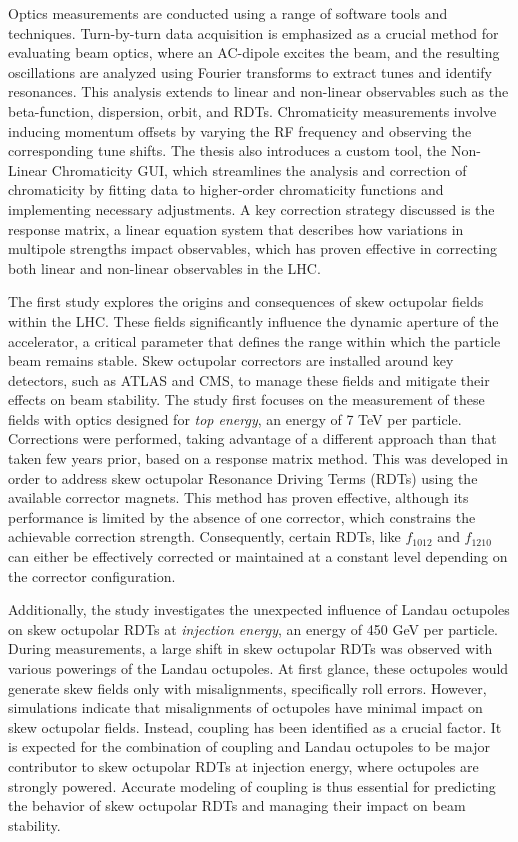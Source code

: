 {Optics measurements are conducted using a range of software tools and techniques. Turn-by-turn data
acquisition is emphasized as a crucial method for evaluating beam optics, where an AC-dipole excites
the beam, and the resulting oscillations are analyzed using Fourier transforms to extract tunes and
identify resonances. This analysis extends to linear and non-linear observables such as the
beta-function, dispersion, orbit, and RDTs. Chromaticity measurements involve inducing momentum
offsets by varying the RF frequency and observing the corresponding tune shifts. The thesis also
introduces a custom tool, the Non-Linear Chromaticity GUI, which streamlines the analysis and
correction of chromaticity by fitting data to higher-order chromaticity functions and implementing
necessary adjustments. A key correction strategy discussed is the response matrix, a linear equation
system that describes how variations in multipole strengths impact observables, which has proven
effective in correcting both linear and non-linear observables in the LHC.


The first study explores the origins and consequences of skew octupolar fields within the LHC. 
These fields significantly influence the dynamic aperture of the accelerator, a critical parameter
that defines the range within which the particle beam remains stable. 
Skew octupolar correctors are installed around key detectors, such as ATLAS and CMS, to manage these
fields and mitigate their effects on beam stability. 
The study first focuses on the measurement of these fields with optics designed for \textit{top
energy}, an energy of 7 TeV per particle. Corrections were performed, taking advantage of a different
approach than that taken few years prior, based on a response matrix method. This was developed in
order to address skew octupolar Resonance Driving Terms (RDTs) using the available corrector
magnets.
This method has proven effective, although its performance is limited by the absence of one
corrector, which constrains the achievable correction strength. Consequently, certain RDTs, like
$f_{1012}$ and $f_{1210}$ can either be effectively corrected or maintained at a constant level
depending on the corrector configuration. 

Additionally, the study investigates the unexpected influence of Landau octupoles on skew octupolar
RDTs at \textit{injection energy}, an energy of 450 GeV per particle. During measurements, a large 
shift in skew octupolar RDTs was observed with various powerings of the Landau octupoles. At first
glance, these octupoles would generate skew fields only with misalignments, specifically roll 
errors. However, simulations indicate that misalignments of octupoles have minimal impact on skew
octupolar fields.  Instead, coupling has been identified as a crucial factor. It is expected for the
combination of coupling and Landau octupoles to be major contributor to skew octupolar RDTs at
injection energy, where octupoles are strongly powered.  Accurate modeling of coupling is thus
essential for predicting the behavior of skew octupolar RDTs and managing their impact on beam
stability.


}
